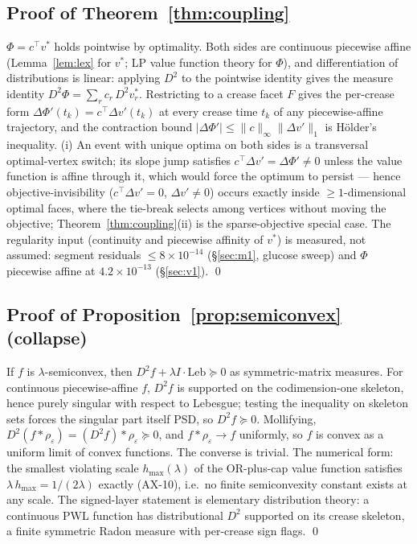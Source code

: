 \documentclass[11pt,a4paper]{article}
\theoremstyle{plain}
\theoremstyle{definition}
\theoremstyle{remark}
\begin{document}
\subsection{Proof of Theorem~\ref{thm:coupling}}

$\Phi = c^\top v^*$ holds pointwise by optimality. Both sides are
continuous piecewise affine (Lemma~\ref{lem:lex} for $v^*$; LP value
function theory for $\Phi$), and differentiation of distributions is
linear: applying $D^2$ to the pointwise identity gives the measure
identity $D^2\Phi = \sum_r c_r\, D^2 v^*_r$. Restricting to a crease
facet $F$ gives the per-crease form $\Delta\Phi'(t_k) = c^\top
\Delta v'(t_k)$ at every crease time $t_k$ of any piecewise-affine
trajectory, and the contraction bound $|\Delta\Phi'| \le
\|c\|_\infty \|\Delta v'\|_1$ is H\"older's inequality. (i) An event
with unique optima on both sides is a transversal optimal-vertex
switch; its slope jump satisfies $c^\top \Delta v' = \Delta\Phi'
\neq 0$ unless the value function is affine through it, which
would force the optimum to persist --- hence
objective-invisibility ($c^\top \Delta v' = 0$, $\Delta v' \ne 0$)
occurs exactly inside $\ge 1$-dimensional optimal faces, where the
tie-break selects among vertices without moving the objective;
Theorem~\ref{thm:coupling}(ii) is the sparse-objective special
case. The regularity input (continuity and piecewise affinity of
$v^*$) is measured, not assumed: segment residuals $\le 8 \times 10^{-14}$ (\S\ref{sec:m1}, glucose sweep) and $\Phi$ piecewise affine at $4.2 \times 10^{-13}$ (\S\ref{sec:v1}). \qed

\subsection{Proof of Proposition~\ref{prop:semiconvex} (collapse)}

If $f$ is $\lambda$-semiconvex, then $D^2 f + \lambda I \cdot
\mathrm{Leb} \succeq 0$ as symmetric-matrix measures. For continuous
piecewise-affine $f$, $D^2 f$ is supported on the codimension-one
skeleton, hence purely singular with respect to Lebesgue; testing
the inequality on skeleton sets forces the singular part itself
PSD, so $D^2 f \succeq 0$. Mollifying, $D^2(f * \rho_\varepsilon)
= (D^2 f) * \rho_\varepsilon \succeq 0$, and $f * \rho_\varepsilon
\to f$ uniformly, so $f$ is convex as a uniform limit of convex
functions. The converse is trivial. The numerical form: the
smallest violating scale $h_{\max}(\lambda)$ of the OR-plus-cap
value function satisfies $\lambda\,h_{\max} = 1/(2\lambda)$
exactly (AX-10), i.e.\ no finite semiconvexity constant exists at
any scale. The signed-layer statement is elementary distribution
theory: a continuous PWL function has distributional $D^2$
supported on its crease skeleton, a finite symmetric Radon measure
with per-crease sign flags. \qed
\end{document}

